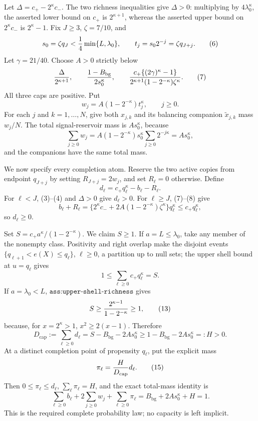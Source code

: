Let \(\Delta=c_+-2^\kappa c_-\).  The two richness inequalities give \(\Delta>0\): multiplying by \(4\lambda_0^\kappa\), the asserted lower bound on \(c_+\) is \(2^{\kappa+1}\), whereas the asserted upper bound on \(2^\kappa c_-\) is \(2^\kappa-1\).  Fix \(J\geq3\), \(\zeta=7/10\), and
\[
s_0=\zeta q_J< {1\over4}\min\{L,\lambda_0\},\qquad
t_j=s_02^{-j}=\zeta q_{J+j}.                                              \tag{6}
\]
Let \(\gamma=21/40\).  Choose \(A>0\) strictly below
\[
{\Delta\over2^{\kappa+1}},\qquad
{1-B_{\mathrm{bg}}\over2s_0^\kappa},\qquad
{c_+\{(2\gamma)^\kappa-1\}
 \over2^{\kappa+1}(1-2^{-\kappa})\zeta^\kappa}.                         \tag{7}
\]
All three caps are positive.  Put
\[
w_j=A(1-2^{-\kappa})t_j^\kappa,\qquad j\geq0.                            \tag{8}
\]
For each \(j\) and \(k=1,\ldots,N\), give both \(x_{j,k}\) and its balancing companion \(\widetilde x_{j,k}\) mass \(w_j/N\).  The total signal-reservoir mass is \(As_0^\kappa\), because
\[
\sum_{j\geq0}w_j
=A(1-2^{-\kappa})s_0^\kappa\sum_{j\geq0}2^{-j\kappa}
=As_0^\kappa,                                                            \tag{9}
\]
and the companions have the same total mass.

We now specify every completion atom.  Reserve the two active copies from endpoint \(q_{J+j}\) by setting \(R_{J+j}=2w_j\), and set \(R_\ell=0\) otherwise.  Define
\[
d_\ell=c_+q_\ell^\kappa-b_\ell-R_\ell.                                \tag{10}
\]
For \(\ell<J\), (3)--(4) and \(\Delta>0\) give \(d_\ell>0\).  For \(\ell\geq J\), (7)--(8) give
\[
b_\ell+R_\ell
=\{2^\kappa c_-+2A(1-2^{-\kappa})\zeta^\kappa\}q_\ell^\kappa
\leq c_+q_\ell^\kappa,                                                  \tag{11}
\]
so \(d_\ell\geq0\).

Set \(S=c_+a^\kappa/(1-2^{-\kappa})\).  We claim \(S\geq1\).  If \(a=L\leq\lambda_0\), take any member of the nonempty class.  Positivity and right overlap make the disjoint events \(\{q_{\ell+1}<e(X)\leq q_\ell\}\), \(\ell\geq0\), a partition up to null sets; the upper shell bound at \(u=q_\ell\) gives
\[
1\leq\sum_{\ell\geq0}c_+q_\ell^\kappa=S.                               \tag{12}
\]
If \(a=\lambda_0<L\), \(\texttt{ass:upper-shell-richness}\) gives
\[
S\geq {2^{\kappa-1}\over1-2^{-\kappa}}\geq1,                            \tag{13}
\]
because, for \(x=2^\kappa>1\), \(x^2\geq2(x-1)\).  Therefore
\[
D_{\mathrm{cap}}:=\sum_{\ell\geq0}d_\ell
=S-B_{\mathrm{bg}}-2As_0^\kappa
\geq1-B_{\mathrm{bg}}-2As_0^\kappa=:H>0.                                \tag{14}
\]
At a distinct completion point of propensity \(q_\ell\), put the explicit mass
\[
\pi_\ell={H\over D_{\mathrm{cap}}}d_\ell.                                                \tag{15}
\]
Then \(0\leq\pi_\ell\leq d_\ell\), \(\sum_\ell\pi_\ell=H\), and the exact total-mass identity is
\[
\sum_{\ell\geq0}b_\ell+2\sum_{j\geq0}w_j+
\sum_{\ell\geq0}\pi_\ell
=B_{\mathrm{bg}}+2As_0^\kappa+H=1.                                      \tag{16}
\]
This is the required complete probability law; no capacity is left implicit.

